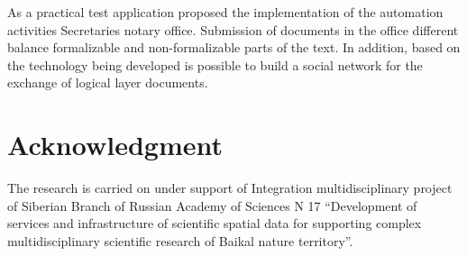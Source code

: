 \documentclass[conference]{IEEEtran}
\begin{document}
	As a practical test application proposed the implementation of the automation activities Secretaries notary office.  Submission of documents in the office different balance formalizable and non-formalizable parts of the text. In addition, based on the technology being developed is possible to build a social network for the exchange of logical layer documents.


\section*{Acknowledgment}
The research is carried on under support of Integration multidisciplinary project of Siberian Branch of Russian Academy of Sciences N 17 “Development of services and infrastructure of scientific spatial data for supporting complex multidisciplinary scientific research of Baikal nature territory”.







\end{document}
